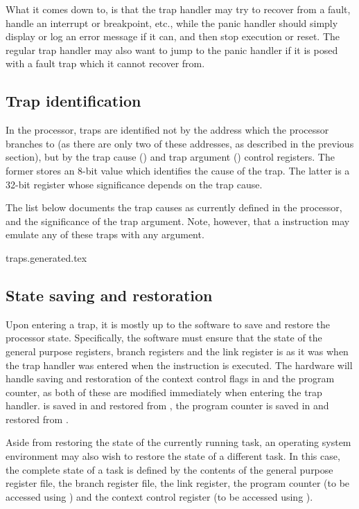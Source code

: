 What it comes down to, is that the trap handler may try to recover from a fault,
handle an interrupt or breakpoint, etc., while the panic handler should simply
display or log an error message if it can, and then stop execution or reset. The
regular trap handler may also want to jump to the panic handler if it is posed
with a fault trap which it cannot recover from.

\subsection{Trap identification}
\label{sec:core-ug-traps-ids}

In the \rvex{} processor, traps are identified not by the address which the 
processor branches to (as there are only two of these addresses, as described in 
the previous section), but by the trap cause () and trap argument 
() control registers. The former stores an 8-bit value which identifies 
the cause of the trap. The latter is a 32-bit register whose significance 
depends on the trap cause.

The list below documents the trap causes as currently defined in the processor,
and the significance of the trap argument. Note, however, that a 
instruction may emulate any of these traps with any argument.

{traps.generated.tex}

\subsection{State saving and restoration}
\label{sec:core-ug-traps-save-restore}

Upon entering a trap, it is mostly up to the software to save and restore the
processor state. Specifically, the software must ensure that the state of the
general purpose registers, branch registers and the link register is as it was
when the trap handler was entered when the  instruction is executed.
The hardware will handle saving and restoration of the context control flags in
 and the program counter, as both of these are modified immediately
when entering the trap handler.  is saved in and restored from
, the program counter is saved in and restored from .

Aside from restoring the state of the currently running task, an operating
system environment may also wish to restore the state of a different task. In
this case, the complete state of a task is defined by the contents of the
general purpose register file, the branch register file, the link register, the
program counter (to be accessed using ) and the context control
register (to be accessed using ).

